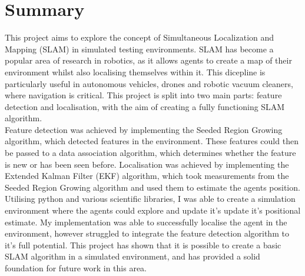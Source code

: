 \documentclass[12pt]{article}
\begin{document}
\newpage

\section*{Summary}
This project aims to explore the concept of Simultaneous Localization and Mapping (SLAM) in simulated testing environments.
SLAM has become a popular area of research in robotics, as it allows agents to create a map of their environment whilst also
localising themselves within it. This dicepline is particularly useful in autonomous vehicles, drones and robotic vacuum cleaners,
where navigation is critical. This project is split into two main parts: feature detection and localisation, with the aim of creating
a fully functioning SLAM algorithm.\\
Feature detection was achieved by implementing the Seeded Region Growing algorithm, which detected features in the environment.
These features could then be passed to a data association algorithm, which determines whether the feature is new or has been seen before.
Localisation was achieved by implementing the Extended Kalman Filter (EKF) algorithm, which took measurements from the Seeded Region
Growing algorithm and used them to estimate the agents position.\\
Utilising python and various scientific libraries, I was able to create a simulation environment where the agents could explore and
update it's update it's positional estimate. My implementation was able to successfully localise the agent in the environment, however
struggled to integrate the feature detection algorithm to it's full potential. This project has shown that it is possible to create a basic SLAM
algorithm in a simulated environment, and has provided a solid foundation for future work in this area.

\newpage
\tableofcontents
\newpage
\end{document}
